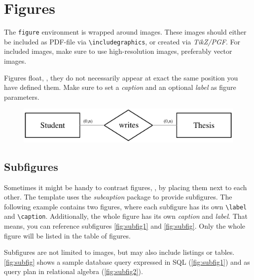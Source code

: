 \section{Figures}

The \texttt{figure} environment is wrapped around images. These images should either be included as PDF-file via \texttt{\textbackslash includegraphics}, or created via \textit{TikZ/PGF}. For included images, make sure to use high-resolution images, preferably vector images.

Figures float, \ie, they do not necessarily appear at exact the same position you have defined them. Make sure to set a  \textit{caption} and an optional \textit{label} as figure parameters. 

\begin{figure}[caption={Relationship of students and theses}, label={fig:img01}]
	{	\includegraphics[width=.6\textwidth]{figures/figure01.pdf}}
\end{figure}

\subsection{Subfigures}
Sometimes it might be handy to contrast figures, \ie, by placing them next to each other. The template uses the \textit{subcaption} package to provide subfigures. The following example contains two figures, where each subfigure has its own \texttt{\textbackslash label} and \texttt{\textbackslash caption}. Additionally, the whole figure has its own \textit{caption} and \textit{label}. That means, you can reference subfigures  \fig \ref{fig:subfig1} and \fig  \ref{fig:subfig}. Only the whole figure will be listed in the table of figures.

Subfigures are not limited to images, but may also include listings or tables. \Fig \ref{fig:subfig} shows a sample database query expressed in \ac{SQL} (\fig \ref{fig:subfig1}) and as query plan in relational algebra  (\fig \ref{fig:subfig2}).
 
